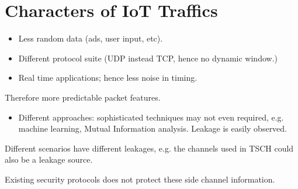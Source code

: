 \section{Characters of IoT Traffics}
\begin{itemize}
	\item Less random data (ads, user input, etc).
	\item Different protocol suite (UDP instead TCP, hence no dynamic window.)
	\item Real time applications; hence less noise in timing.
\end{itemize}

Therefore more predictable packet features.

\begin{itemize}
	\item Different approaches: sophisticated techniques may not even required, e.g. machine learning, Mutual Information analysis. Leakage is easily observed.
\end{itemize}

Different scenarios have different leakages, e.g. the channels used in  TSCH could also be a leakage source.

Existing security protocols does not protect these side channel information.
